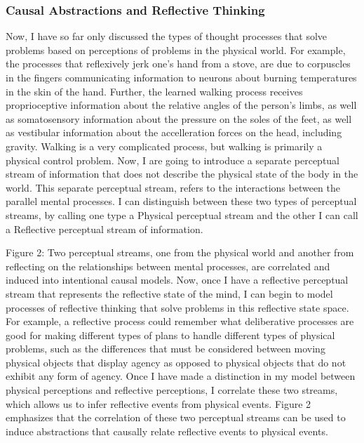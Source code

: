 \subsubsection{Causal Abstractions and Reflective Thinking}

Now, I have so far only discussed the types of thought processes that
solve problems based on perceptions of problems in the physical
world. For example, the processes that reflexively jerk one's hand
from a stove, are due to corpuscles in the fingers communicating
information to neurons about burning temperatures in the skin of the
hand. Further, the learned walking process receives proprioceptive
information about the relative angles of the person's limbs, as well
as somatosensory information about the pressure on the soles of the
feet, as well as vestibular information about the accelleration forces
on the head, including gravity. Walking is a very complicated process,
but walking is primarily a physical control problem. Now, I are going
to introduce a separate perceptual stream of information that does not
describe the physical state of the body in the world. This separate
perceptual stream, refers to the interactions between the parallel
mental processes. I can distinguish between these two types of
perceptual streams, by calling one type a Physical perceptual stream
and the other I can call a Reflective perceptual stream of
information.

Figure 2: Two perceptual streams, one from the physical world and
another from reflecting on the relationships between mental processes,
are correlated and induced into intentional causal models.  Now, once
I have a reflective perceptual stream that represents the reflective
state of the mind, I can begin to model processes of reflective
thinking that solve problems in this reflective state space. For
example, a reflective process could remember what deliberative
processes are good for making different types of plans to handle
different types of physical problems, such as the differences that
must be considered between moving physical objects that display agency
as opposed to physical objects that do not exhibit any form of
agency. Once I have made a distinction in my model between physical
perceptions and reflective perceptions, I correlate these two
streams, which allows us to infer reflective events from physical
events. Figure 2 emphasizes that the correlation of these two
perceptual streams can be used to induce abstractions that causally
relate reflective events to physical events.

